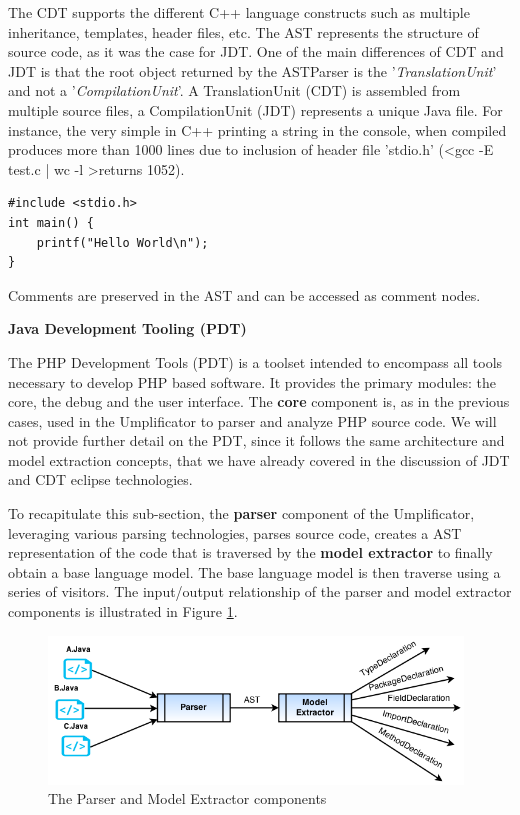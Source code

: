 The CDT supports the different C++ language constructs such as multiple inheritance, templates, header files, etc.
The AST represents the structure of source code, as it was the case for JDT.  One of the main differences of CDT and JDT is that the root object returned by the ASTParser is the '\textit{TranslationUnit}' and not a '\textit{CompilationUnit}'. 
A TranslationUnit (CDT) is assembled from multiple source files, a CompilationUnit (JDT) represents a unique Java file.
For instance, the very simple in C++ printing a string in the console, when compiled produces more than 1000 lines due to inclusion of header file 'stdio.h' (\textless gcc -E test.c | wc -l \textgreater returns 1052).

\begin{lstlisting}[style=java, caption=Simple Example in C++ - test.c , label=lst:cdtsimple]
#include <stdio.h>
int main() {
	printf("Hello World\n");
}
\end{lstlisting}

Comments are preserved in the AST and can be accessed as comment nodes.

\textbf{Java Development Tooling (PDT)}

The PHP Development Tools (PDT) is a toolset intended to encompass all tools necessary to develop PHP based software. 
It provides the primary modules: the core, the debug and the user interface. The \textbf{core} component is, as in the previous cases, used in the Umplificator to parser and analyze PHP source code.
We will not provide further detail on the PDT, since it follows the same architecture and model extraction concepts, that we have already covered in the discussion of JDT and CDT eclipse technologies.

To recapitulate this sub-section, the \textbf{parser} component of the Umplificator, leveraging various parsing technologies, parses source code, creates a AST representation of the code that is traversed by the \textbf{model extractor} to finally obtain a base language model. The base language model is then traverse using a series of visitors. The input/output relationship of the parser and model extractor components is illustrated in Figure \ref{fig:parserINOut}. 

\begin{figure}[h]
\centering
\includegraphics[width=0.98\textwidth]{Figures/parserINOut.png}
\caption{The Parser and Model Extractor components}
\label{fig:parserINOut}
\end{figure}

